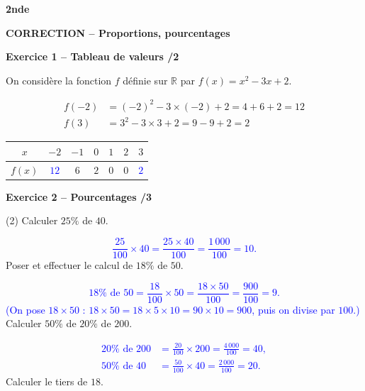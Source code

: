 \documentclass[10pt,a4paper]{article}
\renewcommand{\niveau}{2nde}
\renewcommand{\chapitre}{Proportions, pourcentages}
\renewcommand{\interroversion}[1]{
    \noindent\textbf{\niveau}

    \vspace{-0.5cm}
    \begin{center}
        \textbf{\large CORRECTION -- \chapitre}
    \end{center}

    \vspace{0.1cm}
}
\begin{document}
\newpage


\begin{sujets}

\interroversion{C}

\textbf{Exercice 1 -- Tableau de valeurs \hfill /2}

On considère la fonction \(f\) définie sur \(\mathbb{R}\) par \(f(x)=x^2-3x+2\).

\[
\begin{aligned}
f(-2) &= (-2)^2-3\times(-2)+2 = 4+6+2 = 12\\
f(3)  &= 3^2-3\times 3+2 = 9-9+2 = 2
\end{aligned}
\]

\begin{center}
    \renewcommand{\arraystretch}{1.5}
    \setlength{\tabcolsep}{0.25cm}
    \begin{tabular}{|*{7}{c|}}
    \hline
    \(x\) & \(-2\) & \(-1\) & \(0\) & \(1\) & \(2\) & \(3\) \\
    \hline
    \(f(x)\) & \textcolor{blue}{\(12\)} & \(6\) & \(2\) & \(0\) & \(0\) & \textcolor{blue}{\(2\)} \\
    \hline
    \end{tabular}
\end{center}

\textbf{Exercice 2 -- Pourcentages \hfill /3}

\begin{tasks}(2)
    \task Calculer \(25\%\) de \(40\).

    \textcolor{blue}{
    \[
    \frac{25}{100}\times 40 = \frac{25\times 40}{100} = \frac{1\,000}{100} = 10.
    \]}
    \task Poser et effectuer le calcul de \(18\%\) de \(50\).

    \textcolor{blue}{
    \[
    18\%\text{ de }50 = \frac{18}{100}\times 50 = \frac{18\times 50}{100} = \frac{900}{100} = 9.
    \]
    (On pose \(18\times50\) : \(18\times50=18\times5\times10=90\times10=900\), puis on divise par \(100\).)}
    \task Calculer \(50\%\) de \(20\%\) de \(200\).

    \textcolor{blue}{
    \[
    \begin{aligned}
    20\%\text{ de }200 &=\frac{20}{100}\times200=\frac{4\,000}{100}=40,\\
    50\%\text{ de }40 &=\frac{50}{100}\times40=\frac{2\,000}{100}=20.
    \end{aligned}
    \]}
    \task Calculer le tiers de \(18\).


\end{tasks}
\end{sujets}
\end{document}
